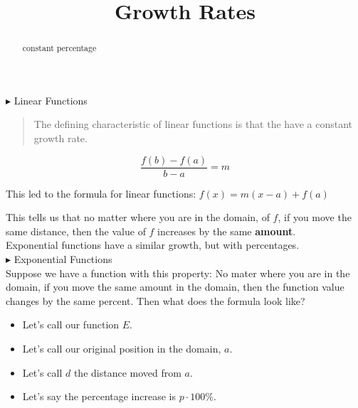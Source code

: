 \documentclass{ximera}
\title{Growth Rates}
\begin{document}
\begin{abstract}
constant percentage
\end{abstract}
\maketitle










$\blacktriangleright$ Linear Functions \\


\begin{quote}
The defining characteristic of linear functions is that the have a constant growth rate.
\end{quote}





\[   \frac{f(b)-f(a)}{b-a} = m       \]

This led to the formula for linear functions:  $f(x) = m(x-a) + f(a)$


This tells us that no matter where you are in the domain, of $f$, if you move the same distance, then the value of $f$ increases by the same \textbf{amount}. \\


Exponential functions have a similar growth, but with percentages. \\



$\blacktriangleright$ Exponential Functions \\



Suppose we have a function with this property:  No mater where you are in the domain, if you move the same amount in the domain, then the function value changes by the same percent.  Then what does the formula look like?



\begin{itemize}
\item Let's call our function $E$.
\item Let's call our original position in the domain, $a$.
\item Let's call $d$ the distance moved from $a$.
\item Let's say the percentage increase is $p \cdot 100\%$. 
\end{itemize}
\end{document}
